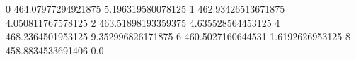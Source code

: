 0 464.07977294921875 5.196319580078125
1 462.93426513671875 4.050811767578125
2 463.51898193359375 4.635528564453125
4 468.2364501953125 9.352996826171875
6 460.5027160644531 1.6192626953125
8 458.8834533691406 0.0
